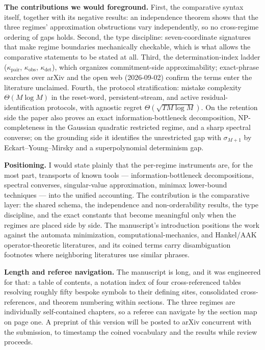 \documentclass[11pt,a4paper]{article}
\begin{document}
\textbf{The contributions we would foreground.} First, the comparative
syntax itself, together with its negative results: an independence theorem
shows that the three regimes' approximation obstructions vary
independently, so no cross-regime ordering of gaps holds. Second, the type
discipline: seven-coordinate signatures that make regime boundaries
mechanically checkable, which is what allows the comparative statements to
be stated at all. Third, the determination-index ladder
($\kappa_{\mathrm{pair}}$, $\kappa_{\mathrm{obs}}$,
$\kappa_{\mathrm{det}}$), which organizes commitment-side approximability;
exact-phrase searches over arXiv and the open web (2026-09-02) confirm the
terms enter the literature unclaimed. Fourth, the protocol stratification:
mistake complexity $\Theta(M\log M)$ in the reset-word, persistent-stream,
and active residual-identification protocols, with agnostic regret
$\Theta(\sqrt{TM\log M})$. On the retention side the paper also proves an
exact information-bottleneck decomposition, NP-completeness in the Gaussian
quadratic restricted regime, and a sharp spectral converse; on the grounding
side it identifies the unrestricted gap with $\sigma_{M+1}$ by
Eckart--Young--Mirsky and a superpolynomial determinism gap.

\textbf{Positioning.} I would state plainly that the per-regime instruments
are, for the most part, transports of known tools --- information-bottleneck
decompositions, spectral converses, singular-value approximation,
minimax lower-bound techniques --- into the unified accounting. The
contribution is the comparative layer: the shared schema, the independence
and non-orderability results, the type discipline, and the exact constants
that become meaningful only when the regimes are placed side by side. The
manuscript's introduction positions the work against the automata
minimization, computational-mechanics, and Hankel/AAK operator-theoretic
literatures, and its coined terms carry disambiguation footnotes where
neighboring literatures use similar phrases.

\textbf{Length and referee navigation.} The manuscript is long, and it was
engineered for that: a table of contents, a notation index of four
cross-referenced tables resolving roughly fifty bespoke symbols to their
defining sites, consolidated cross-references, and theorem numbering within
sections. The three regimes are individually self-contained chapters, so a
referee can navigate by the section map on page one. A preprint of this
version will be posted to arXiv concurrent with the submission, to timestamp
the coined vocabulary and the results while review proceeds.
\end{document}
